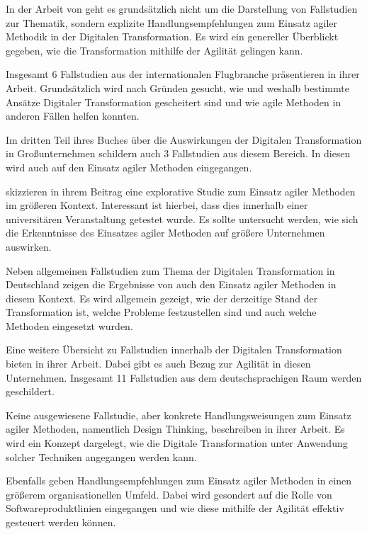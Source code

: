 In der Arbeit von  geht es grundsätzlich nicht um die Darstellung von Fallstudien zur Thematik, sondern explizite Handlungsempfehlungen zum Einsatz agiler Methodik in der Digitalen Transformation. Es wird ein genereller Überblickt gegeben, wie die Transformation mithilfe der Agilität gelingen kann.

Insgesamt 6 Fallstudien aus der internationalen Flugbranche präsentieren  in ihrer Arbeit. Grundsätzlich wird nach Gründen gesucht, wie und weshalb bestimmte Ansätze Digitaler Transformation gescheitert sind und wie agile Methoden in anderen Fällen helfen konnten.

Im dritten Teil ihres Buches über die Auswirkungen der Digitalen Transformation in Großunternehmen schildern  auch 3 Fallstudien aus diesem Bereich. In diesen wird auch auf den Einsatz agiler Methoden eingegangen. 

 skizzieren in ihrem Beitrag eine explorative Studie zum Einsatz agiler Methoden im größeren Kontext. Interessant ist hierbei, dass dies innerhalb einer universitären Veranstaltung getestet wurde. Es sollte untersucht werden, wie sich die Erkenntnisse des Einsatzes agiler Methoden auf größere  Unternehmen auswirken.

Neben allgemeinen Fallstudien zum Thema der Digitalen Transformation in Deutschland zeigen die Ergebnisse von  auch den Einsatz agiler Methoden in diesem Kontext.  Es wird allgemein gezeigt, wie der derzeitige Stand der Transformation ist, welche Probleme festzustellen sind und auch welche Methoden eingesetzt wurden.

Eine weitere Übersicht zu Fallstudien innerhalb der Digitalen Transformation bieten  in ihrer Arbeit. Dabei gibt es auch Bezug zur Agilität in diesen Unternehmen. Insgesamt 11 Fallstudien aus dem deutschsprachigen Raum werden geschildert.

Keine ausgewiesene Fallstudie, aber konkrete Handlungsweisungen zum Einsatz agiler Methoden, namentlich Design Thinking, beschreiben  in ihrer Arbeit. Es wird ein Konzept dargelegt, wie die Digitale Transformation unter Anwendung solcher Techniken angegangen werden kann.

Ebenfalls geben  Handlungsempfehlungen zum Einsatz agiler Methoden in einen größerem organisationellen Umfeld. Dabei wird gesondert auf die Rolle von Softwareproduktlinien eingegangen und wie diese mithilfe der Agilität effektiv gesteuert werden können.

